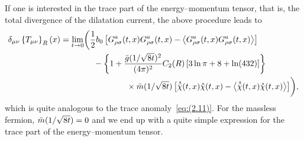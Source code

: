 If one is interested in the trace part of the energy--momentum tensor, that is,
the total divergence of the dilatation current, the above procedure leads to
\begin{align}
   \delta_{\mu\nu}\left\{T_{\mu\nu}\right\}_R(x)
   &=\lim_{t\to0}
   \biggl(\frac{1}{2}b_0
   \left[
   G_{\rho\sigma}^a(t,x)G_{\rho\sigma}^a(t,x)
   -\left\langle G_{\rho\sigma}^a(t,x)G_{\rho\sigma}^a(t,x)\right\rangle
   \right]
\notag\\
   &\qquad\qquad{}
   -\left\{1+\frac{\Bar{g}(1/\sqrt{8t})^2}{(4\pi)^2}C_2(R)
   \left[3\ln\pi+8+\ln(432)\right]\right\}
\notag\\
   &\qquad\qquad\qquad\qquad{}
   \times\Bar{m}(1/\sqrt{8t})\left[
   \mathring{\Bar{\chi}}(t,x)\mathring{\chi}(t,x)
   -\left\langle
   \mathring{\Bar{\chi}}(t,x)\mathring{\chi}(t,x)\right\rangle
   \right]
   \biggr),
\label{eq:(5.7)}
\end{align}
which is quite analogous to the trace anomaly~\eqref{eq:(2.11)}. For the
massless fermion, $\Bar{m}(1/\sqrt{8t})=0$ and we end up with a quite simple
expression for the trace part of the energy--momentum tensor.
